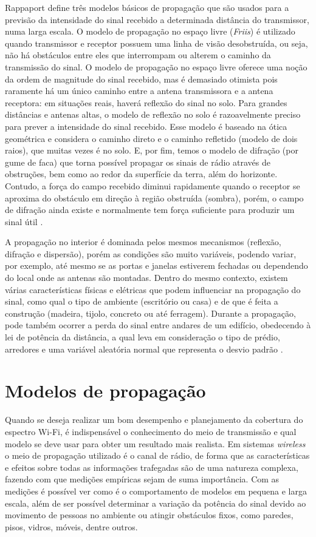 \documentclass[
	12pt,				%
	twoside,			%
	a4paper,			%
	english,			%
	french,				%
	spanish,			%
	brazil				%
	]{abntex2}
\begin{document}
Rappaport define três modelos básicos de propagação que são usados para
a previsão da intensidade do sinal recebido a determinada distância do
transmissor, numa larga escala. O modelo de propagação no espaço livre
(\emph{Friis}) é utilizado quando transmissor e receptor possuem uma
linha de visão desobstruída, ou seja, não há obstáculos entre eles que
interrompam ou alterem o caminho da transmissão do sinal. O modelo de
propagação no espaço livre oferece uma noção da ordem de magnitude do
sinal recebido, mas é demasiado otimista pois raramente há um único
caminho entre a antena transmissora e a antena receptora: em situações
reais, haverá reflexão do sinal no solo. Para grandes distâncias e
antenas altas, o modelo de reflexão no solo é razoavelmente preciso para
prever a intensidade do sinal recebido. Esse modelo é baseado na ótica
geométrica e considera o caminho direto e o caminho refletido (modelo de
dois raios), que muitas vezes é no solo. E, por fim, temos o modelo de
difração (por gume de faca) que torna possível propagar os sinais de
rádio através de obstruções, bem como ao redor da superfície da terra,
além do horizonte. Contudo, a força do campo recebido diminui
rapidamente quando o receptor se aproxima do obstáculo em direção à
região obstruída (sombra), porém, o campo de difração ainda existe e
normalmente tem força suficiente para produzir um sinal útil
\cite[p. 72-83]{RAPPAPORT}.

A propagação no interior é dominada pelos mesmos mecanismos (reflexão,
difração e dispersão), porém as condições são muito variáveis, podendo
variar, por exemplo, até mesmo se as portas e janelas estiverem fechadas
ou dependendo do local onde as antenas são montadas. Dentro do mesmo
contexto, existem várias características físicas e elétricas que podem
influenciar na propagação do sinal, como qual o tipo de ambiente
(escritório ou casa) e de que é feita a construção (madeira, tijolo,
concreto ou até ferragem). Durante a propagação, pode também ocorrer a
perda do sinal entre andares de um edifício, obedecendo à lei de
potência da distância, a qual leva em consideração o tipo de prédio,
arredores e uma variável aleatória normal que representa o desvio padrão
\cite[p. 104-108]{RAPPAPORT}.

\section{Modelos de propagação}\label{modelos-de-propagauxe7uxe3o}

Quando se deseja realizar um bom desempenho e planejamento da cobertura
do espectro Wi-Fi, é indispensável o conhecimento do meio de transmissão
e qual modelo se deve usar para obter um resultado mais realista. Em
sistemas \emph{wireless} o meio de propagação utilizado é o canal de
rádio, de forma que as características e efeitos sobre todas as
informações trafegadas são de uma natureza complexa, fazendo com que
medições empíricas sejam de suma importância. Com as medições é possível
ver como é o comportamento de modelos em pequena e larga escala, além de
ser possível determinar a variação da potência do sinal devido ao
movimento de pessoas no ambiente ou atingir obstáculos fixos, como
paredes, pisos, vidros, móveis, dentre outros.
\end{document}

